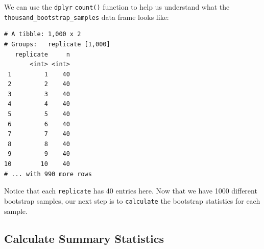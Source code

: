 \documentclass[]{article}
\newenvironment{Shaded}{\begin{snugshade}}{\end{snugshade}}
\newcommand{\KeywordTok}[1]{\textcolor[rgb]{0.13,0.29,0.53}{\textbf{#1}}}
\newcommand{\DataTypeTok}[1]{\textcolor[rgb]{0.13,0.29,0.53}{#1}}
\newcommand{\DecValTok}[1]{\textcolor[rgb]{0.00,0.00,0.81}{#1}}
\newcommand{\StringTok}[1]{\textcolor[rgb]{0.31,0.60,0.02}{#1}}
\newcommand{\CommentTok}[1]{\textcolor[rgb]{0.56,0.35,0.01}{\textit{#1}}}
\newcommand{\OperatorTok}[1]{\textcolor[rgb]{0.81,0.36,0.00}{\textbf{#1}}}
\newcommand{\NormalTok}[1]{#1}
\begin{document}
\begin{Shaded}
\end{Shaded}

We can use the \texttt{dplyr} \texttt{count()} function to help us
understand what the \texttt{thousand\_bootstrap\_samples} data frame
looks like:

\begin{Shaded}
\end{Shaded}

\begin{verbatim}
# A tibble: 1,000 x 2
# Groups:   replicate [1,000]
   replicate     n
       <int> <int>
 1         1    40
 2         2    40
 3         3    40
 4         4    40
 5         5    40
 6         6    40
 7         7    40
 8         8    40
 9         9    40
10        10    40
# ... with 990 more rows
\end{verbatim}

\begin{Shaded}
\end{Shaded}

Notice that each \texttt{replicate} has 40 entries here. Now that we
have 1000 different bootstrap samples, our next step is to
\texttt{calculate} the bootstrap statistics for each sample.

\subsection{Calculate Summary
Statistics}\label{calculate-summary-statistics}
\end{document}
